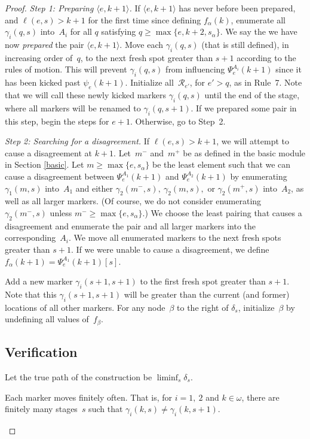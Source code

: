 \documentclass{LMCS}
\newcommand{\0}{\mathbf{0}}
\newcommand{\<}{\langle}
\renewcommand{\>}{\rangle}
\begin{document}
\begin{proof}
{\em Step 1: Preparing $\langle e,k+1\rangle$.} If $\langle e,
k+1\rangle$ has never before been prepared, and $\ell(e,s)>k+1$ for
the first time since defining $f_\alpha(k)$, enumerate all
$\gamma_i(q,s)$ into~$A_i$ for all $q$ satisfying $q\geq\max\{e, k+2,
s_\alpha\}$.  We say the we have now {\em prepared} the pair $\langle
e, k+1\rangle$.  Move each $\gamma_i(q,s)$ (that is still defined), in
increasing order of~$q$, to the next fresh spot greater than $s+1$
according to the rules of motion.  This will prevent $\gamma_i(q,s)$
from influencing $\Psi_e^{A_i}(k+1)$ since it has been kicked past
$\psi_e(k+1)$. Initialize all~$\mathcal R_{e'}$, for $e'>q$, as in
Rule~7.  Note that we will call these newly kicked markers
$\gamma_i(q,s)$ until the end of the stage, where all markers will be
renamed to $\gamma_i(q,s+1)$.  If we prepared some pair in this step,
begin the steps for $e+1$.  Otherwise, go to Step~2.

{\em Step 2: Searching for a disagreement.}  If $\ell(e,s)>k+1$, we will
attempt to cause a disagreement at $k+1$.  Let~$m^-$ and~$m^+$ be as defined
in the basic module in Section \ref{basic}.  Let $m\geq \max\{e, s_\alpha\}$
be the least element such that we can cause a disagreement between
$\Psi_e^{A_1}(k+1)$ and $\Psi_e^{A_2}(k+1)$ by enumerating $\gamma_1(m, s)$
into~$A_1$ and either $\gamma_2(m^-, s),\ \gamma_2(m,s),$ or $\gamma_2(m^+,
s)$ into~$A_2$, as well as all larger markers.  (Of course, we do not consider
enumerating $\gamma_2(m^-, s)$ unless $m^-\geq \max\{e, s_\alpha\}$.)
We choose the least pairing
that causes a disagreement and enumerate the pair and all larger markers into
the corresponding~$A_i$.  We move all enumerated markers to the next fresh
spots greater than $s+1$.  If we were unable to cause a disagreement, we
define $f_\alpha(k+1)=\Psi_e^{A_1}(k+1)[s]$.

Add a new marker $\gamma_i(s+1, s+1)$ to the first fresh spot greater than
$s+1$.  Note that this $\gamma_i(s+1, s+1)$ will be greater than the current
(and former) locations of all other markers.
For any node~$\beta$ to the right of $\delta_s$, initialize~$\beta$ by
undefining all values of~$f_\beta$.

\subsection{Verification}\label{minpairverif}

Let the true path of the construction be $\liminf_s \delta_s$.

\begin{lem}\label{finitemovement}
Each marker moves finitely often.  That is, for $i=1,\ 2$ and $k\in\omega$,
there are finitely many stages~$s$ such that $\gamma_i(k,s)\neq
\gamma_i(k,s+1)$.
\end{lem}


\end{proof}
\end{document}

